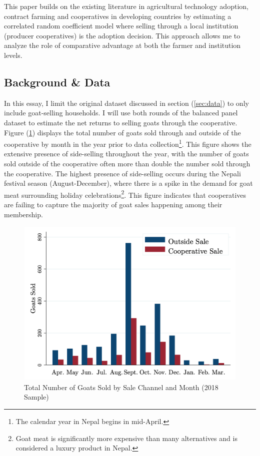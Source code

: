 \documentclass[11pt]{article}
\begin{document}
This paper builds on the existing literature in agricultural technology adoption, contract farming and cooperatives in developing countries by estimating a correlated random coefficient model where selling through a local institution (producer cooperatives) is the adoption decision. This approach allows me to analyze the role of comparative advantage at both the farmer and institution levels. 

\subsection{Background \& Data} \label{sec:E2_data}

In this essay, I limit the original dataset discussed in section (\ref{sec:data}) to only include goat-selling households. I will use both rounds of the balanced panel dataset to estimate the net returns to selling goats through the cooperative. Figure (\ref{figure:E2_month}) displays the total number of goats sold through and outside of the cooperative by month in the year prior to data collection\footnote{The calendar year in Nepal begins in mid-April.}. This figure shows the extensive presence of side-selling throughout the year, with the number of goats sold outside of the cooperative often more than double the number sold through the cooperative. The highest presence of side-selling occurs during the Nepali festival season (August-December), where there is a spike in the demand for goat meat surrounding holiday celebrations\footnote{Goat meat is significantly more expensive than many alternatives and is considered a luxury product in Nepal.}. This figure indicates that cooperatives are failing to capture the majority of goat sales happening among their membership. 

\vspace{.5cm}
\begin{figure}[H]
    \caption{Total Number of Goats Sold by Sale Channel and Month (2018 Sample)}
    \label{figure:E2_month}
    \noindent \centering \includegraphics[width=.55\textwidth,trim=4 4 4 4,clip]{E2_SaleMonth.png}
\end{figure}
\end{document}
